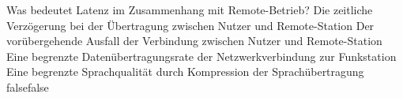     {Was bedeutet Latenz im Zusammenhang mit Remote-Betrieb?}
    {Die zeitliche Verzögerung bei der Übertragung zwischen Nutzer und Remote-Station}
    {Der vorübergehende Ausfall der Verbindung zwischen Nutzer und Remote-Station}
    {Eine begrenzte Datenübertragungsrate der Netzwerkverbindung zur Funkstation}
    {Eine begrenzte Sprachqualität durch Kompression der Sprachübertragung}
    {false}{false}